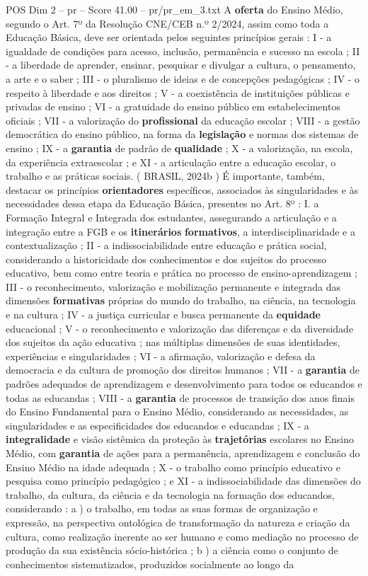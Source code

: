 \begin{textsample}{POS Dim 2 – pr – Score 41.00 – pr/pr\_em\_3.txt}
A \textbf{oferta} do Ensino Médio, segundo o Art. 7º da Resolução CNE/CEB n.º 2/2024, assim como toda a Educação Básica, deve ser orientada pelos seguintes princípios gerais : I - a igualdade de condições para acesso, inclusão, permanência e sucesso na escola ; II - a liberdade de aprender, ensinar, pesquisar e divulgar a cultura, o pensamento, a arte e o saber ; III - o pluralismo de ideias e de concepções pedagógicas ; IV - o respeito à liberdade e aos direitos ; V - a coexistência de instituições públicas e privadas de ensino ; VI - a gratuidade do ensino público em estabelecimentos oficiais ; VII - a valorização do \textbf{profissional} da educação escolar ; VIII - a gestão democrática do ensino público, na forma da \textbf{legislação} e normas dos sistemas de ensino ; IX - a \textbf{garantia} de padrão de \textbf{qualidade} ; X - a valorização, na escola, da experiência extraescolar ; e XI - a articulação entre a educação escolar, o trabalho e as práticas sociais. ( BRASIL, 2024b ) É importante, também, destacar os princípios \textbf{orientadores} específicos, associados às singularidades e às necessidades dessa etapa da Educação Básica, presentes no Art. 8º : I. a Formação Integral e Integrada dos estudantes, assegurando a articulação e a integração entre a FGB e os \textbf{itinerários} \textbf{formativos}, a interdisciplinaridade e a contextualização ; II - a indissociabilidade entre educação e prática social, considerando a historicidade dos conhecimentos e dos sujeitos do processo educativo, bem como entre teoria e prática no processo de ensino-aprendizagem ; III - o reconhecimento, valorização e mobilização permanente e integrada das dimensões \textbf{formativas} próprias do mundo do trabalho, na ciência, na tecnologia e na cultura ; IV - a justiça curricular e busca permanente da \textbf{equidade} educacional ; V - o reconhecimento e valorização das diferenças e da diversidade dos sujeitos da ação educativa ; nas múltiplas dimensões de suas identidades, experiências e singularidades ; VI - a afirmação, valorização e defesa da democracia e da cultura de promoção dos direitos humanos ; VII - a \textbf{garantia} de padrões adequados de aprendizagem e desenvolvimento para todos os educandos e todas as educandas ; VIII - a \textbf{garantia} de processos de transição dos anos finais do Ensino Fundamental para o Ensino Médio, considerando as necessidades, as singularidades e as especificidades dos educandos e educandas ; IX - a \textbf{integralidade} e visão sistêmica da proteção às \textbf{trajetórias} escolares no Ensino Médio, com \textbf{garantia} de ações para a permanência, aprendizagem e conclusão do Ensino Médio na idade adequada ; X - o trabalho como princípio educativo e pesquisa como princípio pedagógico ; e XI - a indissociabilidade das dimensões do trabalho, da cultura, da ciência e da tecnologia na formação dos educandos, considerando : a ) o trabalho, em todas as suas formas de organização e expressão, na perspectiva ontológica de transformação da natureza e criação da cultura, como realização inerente ao ser humano e como mediação no processo de produção da sua existência sócio-histórica ; b ) a ciência como o conjunto de conhecimentos sistematizados, produzidos socialmente ao longo da 
\end{textsample}
